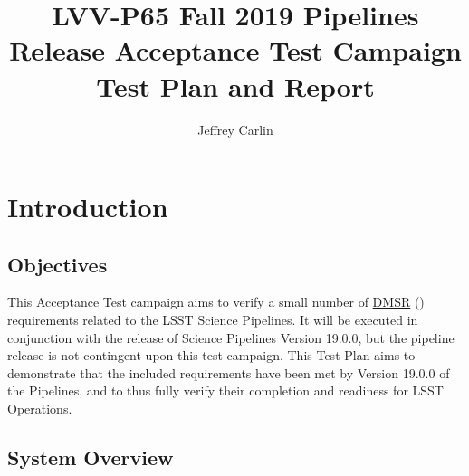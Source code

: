 \documentclass[DM,lsstdraft,STR,toc]{lsstdoc}
\begin{document}
\def\milestoneName{Fall 2019 Pipelines Release Acceptance Test Campaign}
\def\milestoneId{LVV-P65}
\def\product{Acceptance}


\title{ LVV-P65 Fall 2019 Pipelines Release Acceptance Test Campaign Test Plan and Report}
\setDocRef{\lsstDocType-\lsstDocNum}
\date{\vcsdate}
\author{ Jeffrey Carlin }






\maketitle

\section{Introduction}
\label{sect:intro}


\subsection{Objectives}
\label{sect:objectives}

 This Acceptance Test campaign aims to verify a small number of
\href{https://lse-61.lsst.io/}{DMSR} () requirements related to
the LSST Science Pipelines. It will be executed in conjunction with the
release of Science Pipelines Version 19.0.0, but the pipeline release is
not contingent upon this test campaign. This Test Plan aims to
demonstrate that the included requirements have been met by Version
19.0.0 of the Pipelines, and to thus fully verify their completion and
readiness for LSST Operations.



\subsection{System Overview}
\label{sect:systemoverview}
\end{document}
